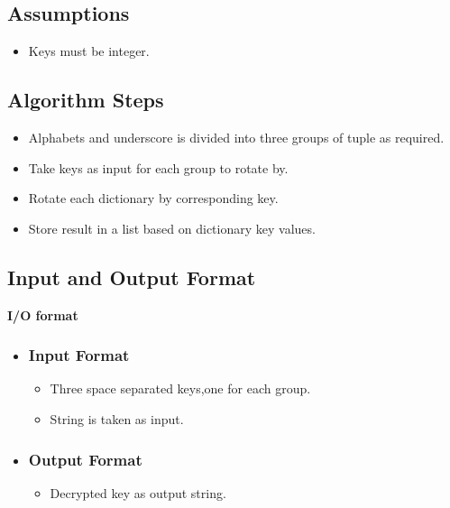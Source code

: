 \documentclass[11pt]{article}
\begin{document}
{\subsection{Assumptions}
{
\begin{itemize}
\item Keys must be integer.
\end{itemize}
}




\subsection{Algorithm Steps}
{
\begin{itemize}
\item Alphabets and underscore is divided into three groups of tuple as required.
\item Take keys as input for each group to rotate by.
\item Rotate each dictionary by corresponding key.
\item Store result in a list based on dictionary key values.
\end{itemize}

\subsection{Input and Output Format}
{


\textbf{I/O format} 
\begin{itemize}
\item \subsubsection{Input Format}
\begin{itemize}
\item Three space separated keys,one for each group.
\item String is taken as input.
\end{itemize}

\item \subsubsection{Output Format}
\begin{itemize}
\item Decrypted key as output string.
\end{itemize}
\end{itemize}


}

}}
\end{document}
